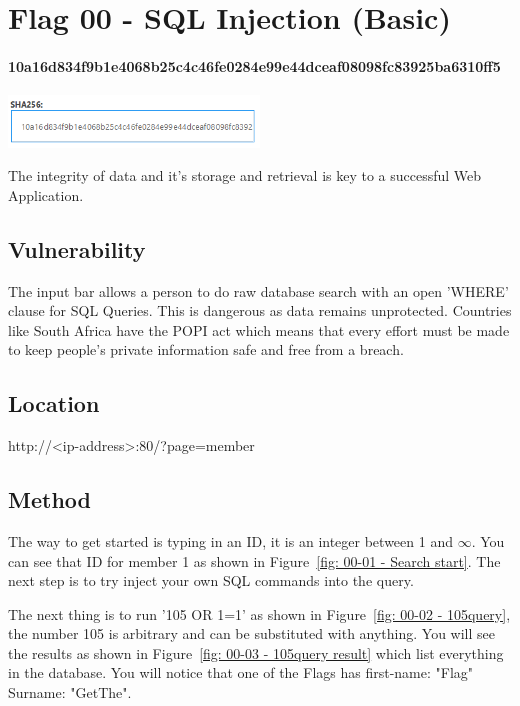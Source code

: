\section{Flag 00 - SQL Injection (Basic)}

\paragraph{10a16d834f9b1e4068b25c4c46fe0284e99e44dceaf08098fc83925ba6310ff5}
\begin{center}
    \includegraphics[width=0.5\textwidth]{03.Flag00/00-08.png}\\[0cm] 
\end{center}

The integrity of data and it's storage and retrieval is key to a successful
Web Application.

\subsection{Vulnerability}

The input bar allows a person to do raw database search with an open
'WHERE' clause for SQL Queries. This is dangerous as data remains unprotected. Countries
like South Africa have the POPI act which means that every effort must be made to keep
people's private information safe and free from a breach.

\subsection{Location}

http://<ip-address>:80/?page=member

\subsection{Method}

The way to get started is typing in an ID, it is an integer between
1 and $\infty$. You can see that ID for member 1 as shown in 
Figure~\vref{fig: 00-01 - Search start}. The next step is to try inject
your own SQL commands into the query\cite{W3Schools-SQLInjection}.

The next thing is to run '105 OR 1=1' as shown in Figure~\vref{fig: 00-02 - 105query}, the number 105 is arbitrary and can be
substituted with anything. You will see the results as shown in Figure~\vref{fig: 00-03 - 105query result}
which list everything in the database. You will notice that one of the Flags has first-name: "Flag"
Surname: "GetThe".

